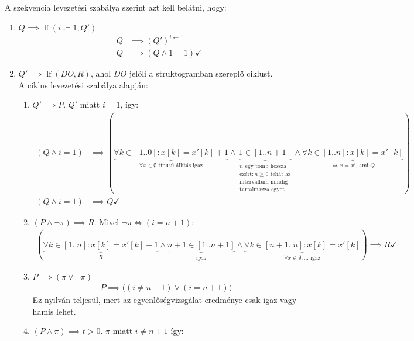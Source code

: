\documentclass[a4paper,12pt]{article}
\DeclareMathOperator{\lf}{lf}
\begin{document}
	\vspace{-5pt}
	\begin{solution}
		A szekvencia levezetési szabálya szerint azt kell belátni, hogy:
		\begin{enumerate}
			\item $ Q \implies \lf{(i \coloneq 1, Q')} $
			\begin{align*}
				Q &\implies (Q')^{i \leftarrow 1} \\
				Q &\implies (Q \land 1 = 1) \checkmark
			\end{align*}
			\item $ Q' \implies \lf{(DO,R)} $, ahol $DO$ jelöli a struktogramban szereplő ciklust. \\
			A ciklus levezetési szabálya alapján:
			\begin{enumerate}
				\item $Q' \implies P$. $Q'$ miatt $i=1$, így:
				\begin{align*}
					(Q \land i=1) &\implies ( \underbrace{ \forall k \in [1..0]: x[k] = x'[k] + 1 }_{\forall x \in \emptyset \text{ típusú állítás igaz}} \land \underbrace{1 \in [1..n+1]}_{\substack{n \text{ egy tömb hossza} \\ \text{ezért}: n \ge 0 \text{ tehát az} \\ \text{intervallum mindig} \\ \text{tartalmazza egyet} }} \land \underbrace{\forall k \in [1..n]: x[k] = x'[k]}_{\iff x=x'\text{, ami }Q} ) \\
					(Q \land i = 1) &\implies Q \checkmark
				\end{align*}
				\item $(P \land \lnot \pi) \implies R $. Mivel $\lnot \pi \iff (i = n + 1)$:
				\begin{align*}
					( \underbrace{ \forall k \in [1..n]: x[k] = x'[k] + 1}_{R} \land \underbrace{n+1 \in [1..n+1]}_{igaz} \land \underbrace{\forall k \in [n+1..n]: x[k] = x'[k]}_{\forall x \in \emptyset: \dots \text{ igaz}} ) \implies R \checkmark
				\end{align*}
				\item $P \implies (\pi \lor \lnot \pi) $
				\begin{align*}
					P \implies \bigl( (i \ne n + 1) \lor (i = n + 1) \bigr)
				\end{align*}
				Ez nyilván teljesül, mert az egyenlőségvizsgálat eredménye csak igaz vagy hamis lehet. 
				\item $(P \land \pi) \implies t > 0$. $\pi$ miatt $i \ne n + 1 $ így:
				\begin{align*}

\end{align*}
\end{enumerate}
\end{enumerate}
\end{solution}
\end{document}
